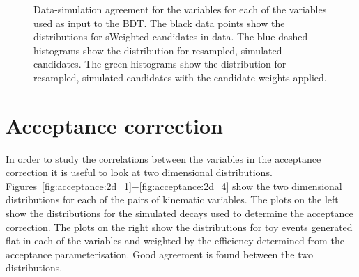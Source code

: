 \begin{figure}[!hb]
 \caption{Data-simulation agreement for the variables for each of the variables used as input to the BDT. The black data points show the distributions for sWeighted \BdToJPsiKst candidates in data. The blue dashed histograms show the distribution for resampled, simulated \BdToJPsiKst candidates. The green histograms show the distribution for resampled, simulated \BdToJPsiKst candidates with the candidate weights applied.}
 \label{fig:appendix:data-mc:bdtvars}
\end{figure}

\clearpage
\section{Acceptance correction}
\label{sec:appendix:acceptance}

In order to study the correlations between the variables in the acceptance correction it is useful to look at two dimensional distributions.  Figures~\ref{fig:acceptance:2d_1}$-$\ref{fig:acceptance:2d_4} show the two dimensional distributions for each of the pairs of kinematic variables.  The plots on the left show the distributions for the simulated decays used to determine the acceptance correction.  The plots on the right show the distributions for toy events generated flat in each of the variables and weighted by the efficiency determined from the acceptance parameterisation. Good agreement is found between the two distributions.

